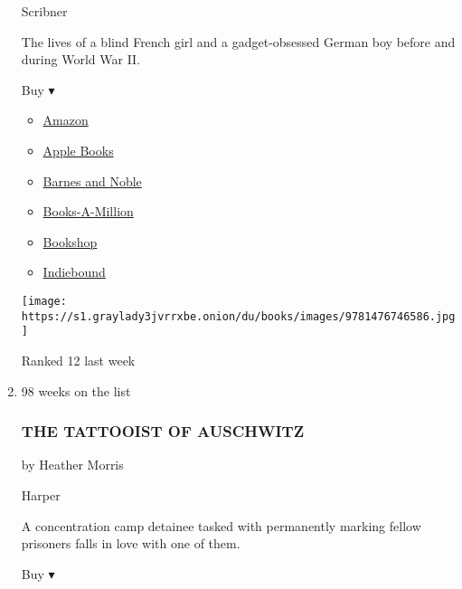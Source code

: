 \begin{enumerate}
  Scribner

  The lives of a blind French girl and a gadget-obsessed German boy
  before and during World War II.

  Buy ▾

  \begin{itemize}
  \tightlist
  \item
    \href{http://www.amazon.com/All-Light-We-Cannot-See/dp/1476746583?tag=NYTBS-20}{Amazon}
  \item
    \href{https://du-gae-books-dot-nyt-du-prd.appspot.com/buy?title=ALL+THE+LIGHT+WE+CANNOT+SEE\&author=Anthony+Doerr}{Apple
    Books}
  \item
    \href{https://www.anrdoezrs.net/click-7990613-11819508?url=https\%3A\%2F\%2Fwww.barnesandnoble.com\%2Fw\%2F\%3Fean\%3D9781501173219}{Barnes
    and Noble}
  \item
    \href{https://www.anrdoezrs.net/click-7990613-35140?url=https\%3A\%2F\%2Fwww.booksamillion.com\%2Fp\%2FALL\%2BTHE\%2BLIGHT\%2BWE\%2BCANNOT\%2BSEE\%2FAnthony\%2BDoerr\%2F9781501173219}{Books-A-Million}
  \item
    \href{https://bookshop.org/a/3546/9781501173219}{Bookshop}
  \item
    \href{https://www.indiebound.org/book/9781501173219?aff=NYT}{Indiebound}
  \end{itemize}

  \texttt{[image: https://s1.graylady3jvrrxbe.onion/du/books/images/9781476746586.jpg]}

  Ranked 12 last week
\item
  \href{https://www.nytimes3xbfgragh.onion/2018/11/16/books/review/tattooist-auschwitz-heather-morris.html}{}

  98 weeks on the list

  \hypertarget{the-tattooist-of-auschwitz}{%
  \subsubsection{THE TATTOOIST OF
  AUSCHWITZ}\label{the-tattooist-of-auschwitz}}

  by Heather Morris

  Harper

  A concentration camp detainee tasked with permanently marking fellow
  prisoners falls in love with one of them.

  Buy ▾


\end{enumerate}
